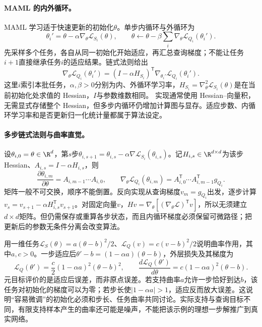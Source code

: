 \paragraph{MAML 的内外循环。}
MAML 学习适于快速更新的初始化$\theta$\cite{finn2017maml}。单步内循环与外循环为
\begin{equation}
 \theta_i'=\theta-\alpha\nabla_\theta\mathcal L_{S_i}(\theta),
 \qquad\theta\leftarrow\theta-\beta\sum_i\nabla_\theta\mathcal L_{Q_i}(\theta_i').
\end{equation}
先采样多个任务，各自从同一初始化开始适应，再汇总查询梯度；不能让任务$i+1$直接继承任务$i$的适应结果。链式法则给出
\begin{equation}
 \nabla_\theta\mathcal L_{Q_i}(\theta_i')
 =(I-\alpha H_{S_i})^{\mathsf T}\nabla_{\theta_i'}\mathcal L_{Q_i}(\theta_i').
\end{equation}
这里$i$索引本批任务，$\alpha,\beta>0$分别为内、外循环学习率，$H_{S_i}=\nabla_\theta^2\mathcal L_{S_i}(\theta)$是在当前初始化处求值的 Hessian，$I$与参数维数相同。
实现通常使用 Hessian--向量积，无需显式存储整个 Hessian，但多步内循环仍增加计算图与显存。适应步数、内循环学习率和是否更新归一化统计量都属于算法设定。

\paragraph{多步链式法则与曲率直觉。}
设$\theta_{i,0}=\theta\in\R^d$，第$s$步$\theta_{i,s+1}=\theta_{i,s}-\alpha\nabla\mathcal L_{S_i}(\theta_{i,s})$。记$H_{i,s}\in\R^{d\times d}$为该步 Hessian、$A_{i,s}=I-\alpha H_{i,s}$，则
\begin{equation}
 \frac{\partial\theta_{i,m}}{\partial\theta}
 =A_{i,m-1}\cdots A_{i,0},\qquad
 \nabla_\theta\mathcal L_{Q_i}(\theta_{i,m})
 =A_{i,0}^{\mathsf T}\cdots A_{i,m-1}^{\mathsf T}g_{Q_i}.
\end{equation}
矩阵一般不可交换，顺序不能倒置。反向实现从查询梯度$v_m=g_{Q_i}$出发，逐步计算$v_s=v_{s+1}-\alpha H_{i,s}^{\mathsf T}v_{s+1}$。对固定向量$v$，$Hv=\nabla_\theta[(\nabla_\theta\mathcal L)^{\mathsf T}v]$，所以无须建立$d\times d$矩阵。但仍需保存或重算各步状态，而且内循环梯度必须保留可微路径；把更新后的参数无条件分离会改变算法。

用一维任务$\mathcal L_S(\theta)=a(\theta-b)^2/2$、$\mathcal L_Q(v)=c(v-b)^2/2$说明曲率作用，其中$a,c>0$。一步适应后$\theta'-b=(1-\alpha a)(\theta-b)$，外层损失及其梯度为
\begin{equation}
 \mathcal L_Q(\theta')=\frac c2(1-\alpha a)^2(\theta-b)^2,
 \qquad \frac{d\mathcal L_Q(\theta')}{d\theta}
 =c(1-\alpha a)^2(\theta-b).
\end{equation}
元目标评价的是适应后误差，而非原点误差。若支持曲率$a$允许一步恰好到达$b$，该任务对初始化的梯度可以为零；若步长使$|1-\alpha a|>1$，适应反而放大误差。这说明“容易微调”的初始化必须和步长、任务曲率共同讨论。实际支持与查询目标不同，有限支持样本产生的曲率还可能是噪声，不能把该示例的理想一步解推广到真实网络。

